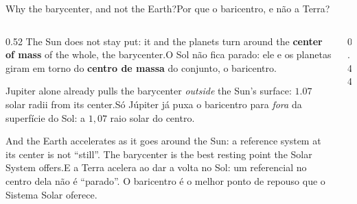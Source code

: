\documentclass[aspectratio=169,11pt]{beamer}
\newcommand{\tr}[2]{\ifEN#2\else#1\fi}
\newcommand{\bnum}[1]{\textbf{\textcolor{mTeal}{#1}}}
\begin{document}
\begin{frame}{\tr{Por que o baricentro, e não a Terra?}{Why the barycenter, and not the Earth?}}
  \begin{columns}[T]
    \begin{column}{0.52\textwidth}
      \small
      \tr{O Sol não fica parado: ele e os planetas giram em torno do \bnum{centro de massa} do
      conjunto, o baricentro.}{The Sun does not stay put: it and the planets turn around the
      \bnum{center of mass} of the whole, the barycenter.}
      \medskip

      \tr{Só Júpiter já puxa o baricentro para \emph{fora} da superfície do Sol: a $1{,}07$ raio
      solar do centro.}{Jupiter alone already pulls the barycenter \emph{outside} the Sun's
      surface: $1.07$ solar radii from its center.}
      \medskip

      \tr{E a Terra \alert{acelera} ao dar a volta no Sol: um referencial no centro dela não é
      ``parado''. O baricentro é o melhor ponto de repouso que o Sistema Solar oferece.}{And the
      Earth \alert{accelerates} as it goes around the Sun: a reference system at its center is not
      ``still''. The barycenter is the best resting point the Solar System offers.}
    \end{column}
    \begin{column}{0.44\textwidth}
      \centering
    \end{column}
  \end{columns}
\end{frame}
\end{document}
